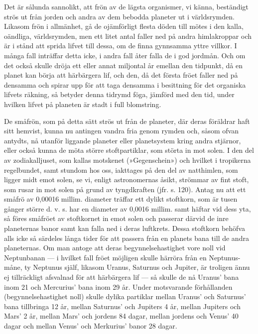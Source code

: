 \documentclass[a4paper, 12pt, oneside, swedish]{article}
\begin{document}
Det är sålunda sannolikt, att frön av de lägsta organismer, vi känna, beständigt strös ut från jorden och andra av dem bebodda planeter ut i världsrymden. Likasom frön i allmänhet, gå de ojämförligt flesta döden till mötes i den kalla, oändliga, världsrymden, men ett litet antal faller ned på andra himlakroppar och är i stånd att sprida lifvet till dessa, om de finna gynnsamma yttre villkor. I många fall inträffar detta icke, i andra fall åter falla de i god jordmån. Och om det också skulle dröja ett eller annat miljontal år emellan den tidpunkt, då en planet kan börja att härbärgera lif, och den, då det första fröet faller ned på densamma och spirar upp för att taga densamma i besittning för det organiska lifvets räkning, så betyder denna tidrymd föga, jämförd med den tid, under hvilken lifvet på planeten är stadt i full blomstring.

De småfrön, som på detta sätt strös ut från de planeter, där deras föräldrar haft sitt hemvist, kunna nu antingen vandra fria genom rymden och, såsom ofvan antydts, nå utanför liggande planeter eller planetsystem kring andra stjärnor, eller också kunna de möta större stoftpartiklar, som störta in mot solen. I den del av zodiakalljuset, som kallas motskenet (»Gegenschein») och hvilket i tropikerna regelbundet, samt stundom hos oss, iakttages på den del av natthimlen, som ligger midt emot solen, se vi, enligt astronomernas åsikt, strömmar av fint stoft, som rusar in mot solen på grund av tyngdkraften (jfr. s. 120). Antag nu att ett småfrö av 0,00016 millim. diameter träffar ett dylikt stoftkorn, som är tusen gånger större d. v. s. har en diameter av 0,0016 millim. samt häftar vid dess yta, så föres småfröet av stoftkornet in emot solen och passerar därvid de inre planeternas banor samt kan falla ned i deras luftkrets. Dessa stoftkorn behöfva alls icke så särdeles långa tider för att passera från en planets bana till de andra planeternas. Om man antoge att deras begynnelsehastighet vore noll vid Neptunbanan --- i hvilket fall fröet möjligen skulle härröra från en Neptunus-måne, ty Neptunus själf, likasom Uranus, Saturnus och Jupiter, är troligen ännu ej tillräckligt afsvalnad för att härbärgera lif --- så skulle de nå Uranus' bana inom 21 och Mercurius' bana inom 29 år. Under motsvarande förhållanden (begynnelsehastighet noll) skulle dylika partiklar mellan Uranus' och Saturnus' bana tillbringa 12 år, mellan Saturnus' och Jupiters 4 år, mellan Jupiters och Mars' 2 år, mellan Mars' och jordens 84 dagar, mellan jordens och Venus' 40 dagar och mellan Venus' och Merkurius' banor 28 dagar.
\end{document}
